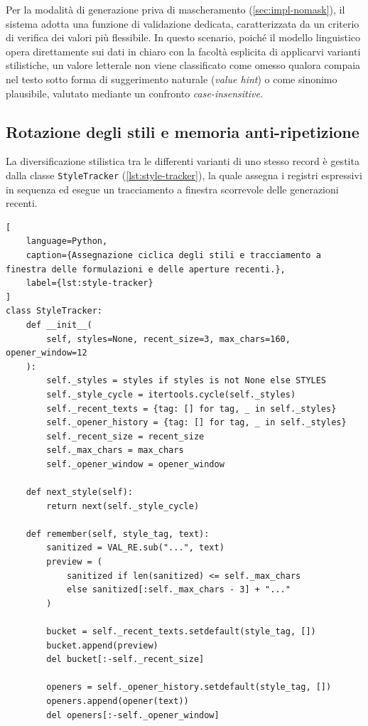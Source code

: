 \documentclass[12pt,a4paper,openright,twoside]{book}
\begin{document}
Per la modalità di generazione priva di mascheramento (\cref{sec:impl-nomask}),
il sistema adotta una funzione di validazione dedicata, caratterizzata da un
criterio di verifica dei valori più flessibile. In questo scenario, poiché il
modello linguistico opera direttamente sui dati in chiaro con la facoltà
esplicita di applicarvi varianti stilistiche, un valore letterale non viene
classificato come omesso qualora compaia nel testo sotto forma di suggerimento
naturale (\textit{value hint}) o come sinonimo plausibile, valutato mediante un
confronto \textit{case-insensitive}.

\subsection{Rotazione degli stili e memoria anti-ripetizione}
\label{sec:impl-styles}

La diversificazione stilistica tra le differenti varianti di uno stesso record è
gestita dalla classe \texttt{StyleTracker} (\cref{lst:style-tracker}), la quale
assegna i registri espressivi in sequenza ed esegue un tracciamento a finestra
scorrevole delle generazioni recenti.

\begin{lstlisting}[
    language=Python,
    caption={Assegnazione ciclica degli stili e tracciamento a finestra delle formulazioni e delle aperture recenti.},
    label={lst:style-tracker}
]
class StyleTracker:
    def __init__(
        self, styles=None, recent_size=3, max_chars=160, opener_window=12
    ):
        self._styles = styles if styles is not None else STYLES
        self._style_cycle = itertools.cycle(self._styles)
        self._recent_texts = {tag: [] for tag, _ in self._styles}
        self._opener_history = {tag: [] for tag, _ in self._styles}
        self._recent_size = recent_size
        self._max_chars = max_chars
        self._opener_window = opener_window

    def next_style(self):
        return next(self._style_cycle)

    def remember(self, style_tag, text):
        sanitized = VAL_RE.sub("...", text)
        preview = (
            sanitized if len(sanitized) <= self._max_chars
            else sanitized[:self._max_chars - 3] + "..."
        )
        
        bucket = self._recent_texts.setdefault(style_tag, [])
        bucket.append(preview)
        del bucket[:-self._recent_size]
        
        openers = self._opener_history.setdefault(style_tag, [])
        openers.append(opener(text))
        del openers[:-self._opener_window]
\end{lstlisting}
\end{document}
